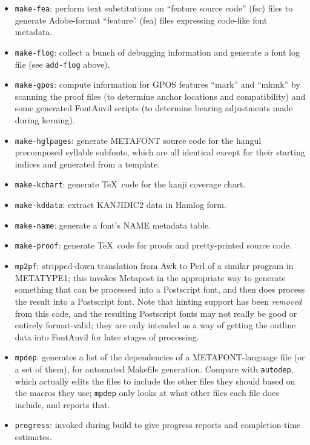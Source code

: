 \documentclass[14pt]{extarticle}
\begin{document}
\begin{itemize}
\item \texttt{make-fea}: perform text substitutions on ``feature source
code'' (fsc) files to generate Adobe-format ``feature'' (fea) files
expressing code-like font metadata.

\item \texttt{make-flog}: collect a bunch of debugging information and
generate a font log file (see \texttt{add-flog} above).

\item \texttt{make-gpos}: compute information for GPOS features ``mark'' and
``mkmk'' by scanning the proof files (to determine anchor locations and
compatibility) and some generated FontAnvil scripts (to determine bearing
adjustments made during kerning).

\item \texttt{make-hglpages}: generate METAFONT source code for the hangul
precomposed syllable subfonts, which are all identical except for their
starting indices and generated from a template.

\item \texttt{make-kchart}: generate \TeX\ code for the kanji coverage
chart.

\item \texttt{make-kddata}: extract KANJIDIC2 data in Hamlog form.

\item \texttt{make-name}: generate a font's NAME metadata table.

\item \texttt{make-proof}: generate \TeX\ code for proofs and pretty-printed
source code.

\item \texttt{mp2pf}: stripped-down translation from Awk to Perl of a
similar program in METATYPE1; this invokes Metapost in the appropriate way
to generate something that can be processed into a Postscript font, and then
does process the result into a Postscript font.  Note that hinting support
has been \emph{removed} from this code, and the resulting Postscript fonts
may not really be good or entirely format-valid; they are only intended as a
way of getting the outline data into FontAnvil for later stages of
processing.

\item \texttt{mpdep}: generates a list of the dependencies of a
METAFONT-language file (or a set of them), for automated Makefile generation. 
Compare with \texttt{autodep}, which actually edits the files to include the
other files they should based on the macros they use; \texttt{mpdep} only
looks at what other files each file does include, and reports that.

\item \texttt{progress}: invoked during build to give progress reports and
completion-time estimates.

\end{itemize}
\end{document}
